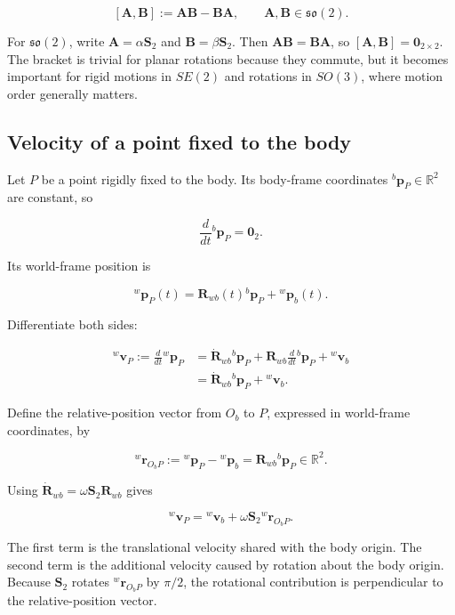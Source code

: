 \documentclass[
  australian,
  12pt,
  letterpaper,
  DIV=11,
  numbers=noendperiod,
  twoside]{scrreprt}
\begin{document}
\[
[\mathbf A,\mathbf B]
\mathrel{:=}
\mathbf A\mathbf B-\mathbf B\mathbf A,
\qquad
\mathbf A,\mathbf B\in\mathfrak{so}(2).
\]

For \(\mathfrak{so}(2)\), write \(\mathbf A=\alpha\mathbf S_2\) and
\(\mathbf B=\beta\mathbf S_2\). Then
\(\mathbf A\mathbf B=\mathbf B\mathbf A\), so
\([\mathbf A,\mathbf B]=\mathbf 0_{2\times2}\). The bracket is trivial
for planar rotations because they commute, but it becomes important for
rigid motions in \(SE(2)\) and rotations in \(SO(3)\), where motion
order generally matters.

\subsection{Velocity of a point fixed to the
body}\label{sec-se2-body-point-velocity}

Let \(P\) be a point rigidly fixed to the body. Its body-frame
coordinates \({}^{b}\mathbf p_P\in\mathbb R^2\) are constant, so

\[
\frac{d}{dt}{}^{b}\mathbf p_P
=
\mathbf 0_2.
\]

Its world-frame position is

\[
{}^{w}\mathbf p_P(t)
=
\mathbf R_{wb}(t){}^{b}\mathbf p_P
+
{}^{w}\mathbf p_b(t).
\]

Differentiate both sides:

\[
\begin{aligned}
{}^{w}\mathbf v_P
\mathrel{:=}
\frac{d}{dt}{}^{w}\mathbf p_P
&=
\dot{\mathbf R}_{wb}{}^{b}\mathbf p_P
+
\mathbf R_{wb}\frac{d}{dt}{}^{b}\mathbf p_P
+
{}^{w}\mathbf v_b\\
&=
\dot{\mathbf R}_{wb}{}^{b}\mathbf p_P
+
{}^{w}\mathbf v_b.
\end{aligned}
\]

Define the relative-position vector from \(O_b\) to \(P\), expressed in
world-frame coordinates, by

\[
{}^{w}\mathbf r_{O_bP}
\mathrel{:=}
{}^{w}\mathbf p_P-{}^{w}\mathbf p_b
=
\mathbf R_{wb}{}^{b}\mathbf p_P
\in\mathbb R^2.
\]

Using \(\dot{\mathbf R}_{wb}=\omega\mathbf S_2\mathbf R_{wb}\) gives

\[
\boxed{
{}^{w}\mathbf v_P
=
{}^{w}\mathbf v_b
+
\omega\mathbf S_2{}^{w}\mathbf r_{O_bP}
}.
\]

The first term is the translational velocity shared with the body
origin. The second term is the additional velocity caused by rotation
about the body origin. Because \(\mathbf S_2\) rotates
\({}^{w}\mathbf r_{O_bP}\) by \(\pi/2\), the rotational contribution is
perpendicular to the relative-position vector.
\end{document}
